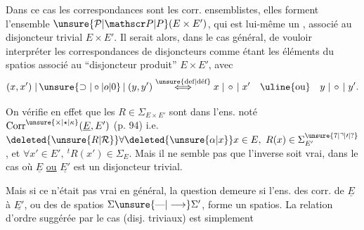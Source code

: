 Dans ce cas les correspondances   sont les corr. ensemblistes, elles forment l'ensemble $\unsure{\mathcal P|\mathscr P|P}(E\times E')$, qui est lui-même un  , associé au disjoncteur trivial $E\times E'$. Il serait  alors, dans le cas général, de vouloir interpréter les correspondances de disjoncteurs  comme étant les éléments du spatios associé au ``disjoncteur produit'' $E\times E'$, avec
\[
 (x,x')\mathrel{|\,\unsure{\supset|\circ|o|0}\,|}(y,y')
 \overset{\text{\unsure{def|déf}}}{\Longleftrightarrow}
 x\mathrel{|\,\circ\,|}x'\quad\text{\uline{ou}}\quad y\mathrel{|\,\circ\,|}y'.
\]

On vérifie en effet que les  $R\in\Sigma_{E\times E'}$ sont dans l'ens. noté $\operatorname{Corr}^{\unsure{\times|\star|\kappa}}(\underline E,E')$ (p. 94) i.e. $\deleted{\unsure{R|\mathcal R}}\forall \deleted{\unsure{\alpha|x}}x\in E,\ R(x)\in\Sigma_{E'}^{\unsure{7|\urcorner|\prime|?}}$, et $\forall x'\in E',\ {}^{t}R(x')\in\Sigma_E$. Mais il ne semble pas que  l'inverse soit vrai,  dans le cas où $\underline E$ \uline{ou} $\underline{E'}$ est un disjoncteur trivial.

Mais si ce n'était pas vrai en général, la question demeure si l'ens. des  corr. de $\underline E$ à $\underline{E'}$, ou  des  de spatios $\Sigma\unsure{\mbox{---}|\longrightarrow}\Sigma'$, forme un spatios. La relation d'ordre suggérée par le cas  (disj. triviaux) est simplement
